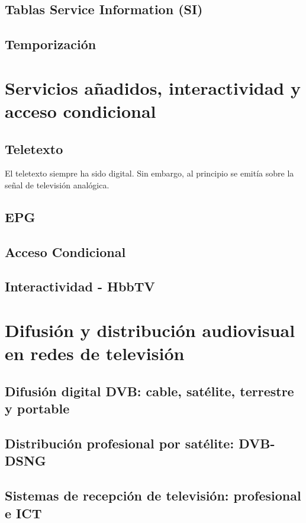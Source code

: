 \documentclass[10pt]{book}
\begin{document}
\section{Tablas Service Information (SI)}
\section{Temporización}


\chapter{Servicios añadidos, interactividad y acceso condicional}

\section{Teletexto}

El teletexto siempre ha sido digital. Sin embargo, al principio se emitía sobre la señal de televisión analógica.

\section{EPG}
\section{Acceso Condicional}
\section{Interactividad - HbbTV}

\chapter{Difusión y distribución audiovisual en redes de televisión}
\section{Difusión digital DVB: cable, satélite, terrestre y portable}
\section{Distribución profesional por satélite: DVB-DSNG}
\section{Sistemas de recepción de televisión: profesional e ICT}
\end{document}
